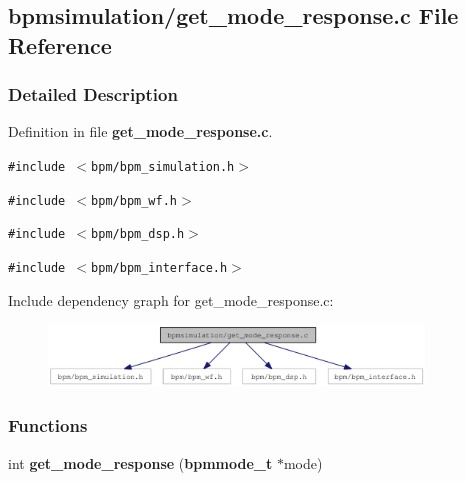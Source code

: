 \subsection{bpmsimulation/get\_\-mode\_\-response.c File Reference}
\label{get__mode__response_8c}


\subsubsection{Detailed Description}


Definition in file {\bf get\_\-mode\_\-response.c}.

{\tt \#include $<$bpm/bpm\_\-simulation.h$>$}\par
{\tt \#include $<$bpm/bpm\_\-wf.h$>$}\par
{\tt \#include $<$bpm/bpm\_\-dsp.h$>$}\par
{\tt \#include $<$bpm/bpm\_\-interface.h$>$}\par


Include dependency graph for get\_\-mode\_\-response.c:\nopagebreak
\begin{figure}[H]
\begin{center}
\leavevmode
\includegraphics[width=283pt]{get__mode__response_8c__incl}
\end{center}
\end{figure}
\subsubsection*{Functions}
\begin{CompactItemize}
\item 
int {\bf get\_\-mode\_\-response} ({\bf bpmmode\_\-t} $\ast$mode)
\end{CompactItemize}
